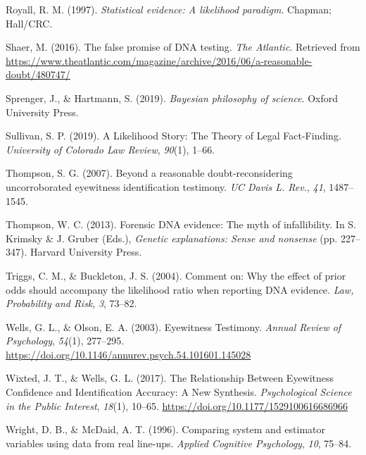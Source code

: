 \documentclass[
  letterpaper,
  DIV=11,
  numbers=noendperiod]{scrartcl}
\newlength{\cslhangindent}
\newlength{\cslentryspacingunit} %
\newenvironment{CSLReferences}[2] %
 {%
  \setlength{\parindent}{0pt}
  \ifodd #1
  \let\oldpar\par
  \def\par{\hangindent=\cslhangindent\oldpar}
  \fi
  \setlength{\parskip}{#2\cslentryspacingunit}
 }%
 {}
\begin{document}
\begin{CSLReferences}{1}{0}
\leavevmode{}%
Royall, R. M. (1997). \emph{Statistical evidence: A likelihood
paradigm}. Chapman; Hall/CRC.

\leavevmode{}%
Shaer, M. (2016). The false promise of DNA testing. \emph{The Atlantic}.
Retrieved from
\url{https://www.theatlantic.com/magazine/archive/2016/06/a-reasonable-doubt/480747/}

\leavevmode{}%
Sprenger, J., \& Hartmann, S. (2019). \emph{Bayesian philosophy of
science}. Oxford University Press.

\leavevmode{}%
Sullivan, S. P. (2019). A {Likelihood Story}: {The Theory} of {Legal
Fact}-{Finding}. \emph{University of Colorado Law Review}, \emph{90}(1),
1--66.

\leavevmode{}%
Thompson, S. G. (2007). Beyond a reasonable doubt-reconsidering
uncorroborated eyewitness identification testimony. \emph{UC Davis L.
Rev.}, \emph{41}, 1487--1545.

\leavevmode{}%
Thompson, W. C. (2013). Forensic {DNA} evidence: The myth of
infallibility. In S. Krimsky \& J. Gruber (Eds.), \emph{Genetic
explanations: Sense and nonsense} (pp. 227--347). Harvard University
Press.

\leavevmode{}%
Triggs, C. M., \& Buckleton, J. S. (2004). Comment on: {Why} the effect
of prior odds should accompany the likelihood ratio when reporting {DNA}
evidence. \emph{Law, Probability and Risk}, \emph{3}, 73--82.

\leavevmode{}%
Wells, G. L., \& Olson, E. A. (2003). Eyewitness {Testimony}.
\emph{Annual Review of Psychology}, \emph{54}(1), 277--295.
\url{https://doi.org/10.1146/annurev.psych.54.101601.145028}

\leavevmode{}%
Wixted, J. T., \& Wells, G. L. (2017). The {Relationship Between
Eyewitness Confidence} and {Identification Accuracy}: {A New Synthesis}.
\emph{Psychological Science in the Public Interest}, \emph{18}(1),
10--65. \url{https://doi.org/10.1177/1529100616686966}

\leavevmode{}%
Wright, D. B., \& McDaid, A. T. (1996). Comparing system and estimator
variables using data from real line-ups. \emph{Applied Cognitive
Psychology}, \emph{10}, 75--84.

\end{CSLReferences}
\end{document}
